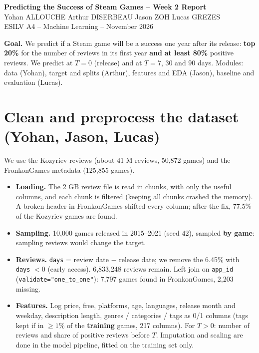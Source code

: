 \documentclass[11pt,a4paper]{article}
\newcommand{\code}[1]{\texttt{#1}}
\begin{document}
\begin{center}
{\Large \textbf{Predicting the Success of Steam Games -- Week 2 Report}}\\[3pt]
Yohan ALLOUCHE \quad Arthur DISERBEAU \quad Jason ZOH \quad Lucas GREZES\\
\small ESILV A4 -- Machine Learning -- November 2026
\end{center}

\textbf{Goal.} We predict if a Steam game will be a success one year after its release:
\textbf{top 20\%} for the number of reviews in its first year \textbf{and} \textbf{at least 80\%} positive reviews.
We predict at $T = 0$ (release) and at $T = 7$, $30$ and $90$ days.
Modules: data (Yohan), target and splits (Arthur), features and EDA (Jason), baseline and evaluation (Lucas).

\section{Clean and preprocess the dataset (Yohan, Jason, Lucas)}

We use the Kozyriev reviews (about 41 M reviews, 50,872 games) and the FronkonGames metadata (125,855 games).
\begin{itemize}
  \item \textbf{Loading.} The 2 GB review file is read in chunks, with only the useful columns, and each chunk is filtered (keeping all chunks crashed the memory).
        A broken header in FronkonGames shifted every column; after the fix, 77.5\% of the Kozyriev games are found.
  \item \textbf{Sampling.} 10,000 games released in 2015--2021 (seed 42), sampled \textbf{by game}: sampling reviews would change the target.
  \item \textbf{Reviews.} \code{days} = review date $-$ release date; we remove the 6.45\% with \code{days} $< 0$ (early access). 6,833,248 reviews remain.
        Left join on \code{app\_id} (\code{validate="one\_to\_one"}): 7,797 games found in FronkonGames, 2,203 missing.
  \item \textbf{Features.} Log price, free, platforms, age, languages, release month and weekday, description length,
        genres / categories / tags as 0/1 columns (tags kept if in $\geq 1\%$ of the \textbf{training} games, 217 columns).
        For $T > 0$: number of reviews and share of positive reviews before $T$.
        Imputation and scaling are done in the model pipeline, fitted on the training set only.
\end{itemize}
\end{document}
